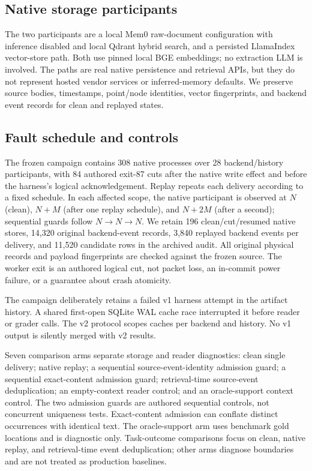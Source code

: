\documentclass[10pt,letterpaper]{article}
\begin{document}
\subsection{Native storage participants}
The two participants are a local Mem0 raw-document configuration with inference disabled and local Qdrant hybrid search, and a persisted LlamaIndex vector-store path. Both use pinned local BGE embeddings; no extraction LLM is involved. The paths are real native persistence and retrieval APIs, but they do not represent hosted vendor services or inferred-memory defaults. We preserve source bodies, timestamps, point/node identities, vector fingerprints, and backend event records for clean and replayed states.

\subsection{Fault schedule and controls}
The frozen campaign contains 308 native processes over 28 backend/history participants, with 84 authored exit-87 cuts after the native write effect and before the harness's logical acknowledgement. Replay repeats each delivery according to a fixed schedule. In each affected scope, the native participant is observed at $N$ (clean), $N+M$ (after one replay schedule), and $N+2M$ (after a second); sequential guards follow $N\rightarrow N\rightarrow N$. We retain 196 clean/cut/resumed native stores, 14,320 original backend-event records, 3,840 replayed backend events per delivery, and 11,520 candidate rows in the archived audit. All original physical records and payload fingerprints are checked against the frozen source. The worker exit is an authored logical cut, not packet loss, an in-commit power failure, or a guarantee about crash atomicity.

The campaign deliberately retains a failed v1 harness attempt in the artifact history. A shared first-open SQLite WAL cache race interrupted it before reader or grader calls. The v2 protocol scopes caches per backend and history. No v1 output is silently merged with v2 results.

Seven comparison arms separate storage and reader diagnostics: clean single delivery; native replay; a sequential source-event-identity admission guard; a sequential exact-content admission guard; retrieval-time source-event deduplication; an empty-context reader control; and an oracle-support context control. The two admission guards are authored sequential controls, not concurrent uniqueness tests. Exact-content admission can conflate distinct occurrences with identical text. The oracle-support arm uses benchmark gold locations and is diagnostic only. Task-outcome comparisons focus on clean, native replay, and retrieval-time event deduplication; other arms diagnose boundaries and are not treated as production baselines.
\end{document}
